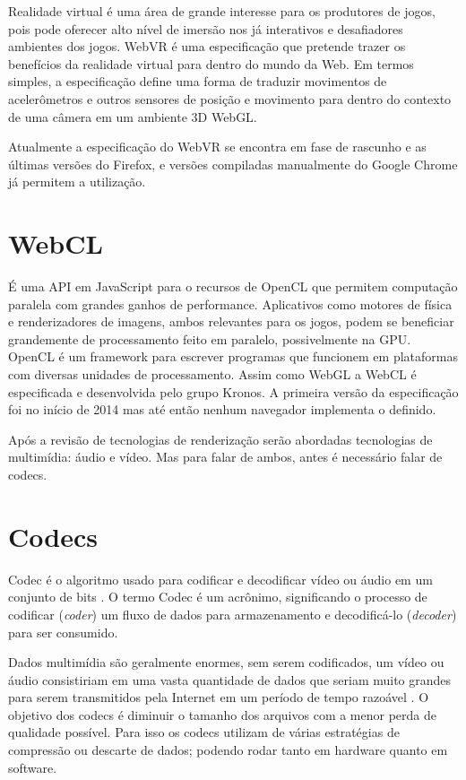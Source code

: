 Realidade virtual é uma área de grande interesse para os produtores de
jogos, pois pode oferecer alto nível de imersão nos já interativos
e desafiadores ambientes dos jogos. WebVR é uma especificação que
pretende trazer os benefícios da realidade virtual para dentro do mundo
da Web. Em termos simples, a especificação define uma forma de traduzir
movimentos de acelerômetros e outros sensores de posição e movimento
para dentro do contexto de uma câmera em um ambiente 3D WebGL.

Atualmente a especificação do WebVR se encontra em fase de rascunho e
as últimas versões do Firefox, e versões compiladas manualmente do
Google Chrome já permitem a utilização.
\section{WebCL}
É uma API em JavaScript para o recursos de OpenCL que permitem
computação paralela com grandes ganhos de performance. Aplicativos
como motores de física e renderizadores de imagens, ambos relevantes
para os jogos, podem se beneficiar grandemente de processamento feito
em paralelo, possivelmente na GPU. OpenCL é um framework para escrever
programas que funcionem em plataformas com diversas unidades de
processamento. Assim como WebGL a WebCL é especificada e desenvolvida
pelo grupo Kronos. A primeira versão da especificação foi no início
de 2014 mas até então nenhum navegador implementa o definido.

Após a revisão de tecnologias de renderização serão abordadas
tecnologias de multimídia: áudio e vídeo. Mas para falar de ambos,
antes é necessário falar de codecs.

\section{Codecs}

Codec é o algoritmo usado para codificar e decodificar vídeo ou
áudio em um conjunto de bits \autocite{diveIntohtml}. O termo Codec é
um acrônimo, significando o processo de codificar (\textit{coder}) um fluxo de dados
para armazenamento e decodificá-lo (\textit{decoder}) para ser consumido.

Dados multimídia são geralmente enormes, sem serem codificados,
um vídeo ou áudio consistiriam em uma vasta quantidade de dados
que seriam muito grandes para serem transmitidos pela Internet em um
período de tempo razoável \autocite[p. 66]{proHtml5}. O objetivo dos
codecs é diminuir o tamanho dos arquivos com a menor perda de qualidade
possível. Para isso os codecs utilizam de várias estratégias de
compressão ou descarte de dados; podendo rodar tanto em hardware quanto
em software.

